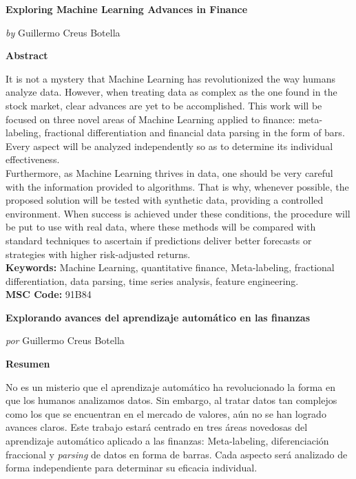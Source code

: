 \thispagestyle{empty}
\begin{center}
	\Large
	\textbf{Exploring Machine Learning Advances in Finance}
	
	\large
	\vspace{.4cm}
	\textit{by} Guillermo Creus Botella
	
	\vspace{.9cm}
	\textbf{Abstract}
\end{center}

It is not a mystery that Machine Learning has revolutionized the way humans 
analyze data. However, when treating data as complex as the one found in the 
stock market, clear advances are yet to be accomplished. This work will be 
focused on three novel areas of Machine Learning applied to finance: meta-
labeling, fractional differentiation and financial data parsing in the form 
of bars. Every aspect will be analyzed independently so as to determine its 
individual effectiveness.\\

Furthermore, as Machine Learning thrives in data, one should be very careful 
with the information provided to algorithms. That is why, whenever possible, 
the proposed solution will be tested with synthetic data, providing a 
controlled environment. When success is achieved under these conditions, 
the procedure will be put to use with real data, where these methods will be 
compared with standard techniques to ascertain if predictions deliver better 
forecasts or strategies with higher risk-adjusted returns.\\

\textbf{Keywords:} Machine Learning, quantitative finance, Meta-labeling, 
fractional differentiation, data parsing, time series analysis, feature 
engineering.\\

\textbf{MSC Code:} 91B84

\newpage
\thispagestyle{empty}
\begin{center}
	\Large
	\textbf{Explorando avances del aprendizaje automático en las finanzas}
	
	\large
	\vspace{.4cm}
	\textit{por} Guillermo Creus Botella
	
	\vspace{.9cm}
	\textbf{Resumen}
\end{center}

No es un misterio que el aprendizaje automático ha revolucionado la forma en 
que los humanos analizamos datos. Sin embargo, al tratar datos tan complejos 
como los que se encuentran en el mercado de valores, aún no se han logrado 
avances claros. Este trabajo estará centrado en tres áreas novedosas del 
aprendizaje automático aplicado a las finanzas: Meta-labeling, 
diferenciación fraccional y \textit{parsing} de datos en forma de barras. 
Cada aspecto será analizado de forma independiente para determinar su 
eficacia individual.\\

